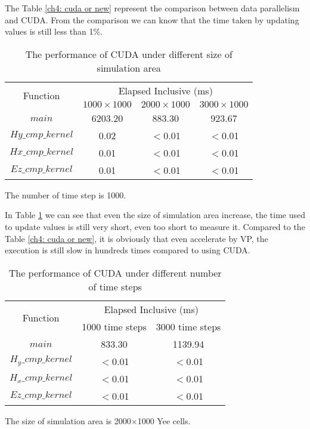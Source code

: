 The Table \ref{ch4: cuda or new} represent the comparison between data parallelism and CUDA. From the comparison we can know that the time taken by updating values is still less than 1\%.

\begin{table}[hp]
	\centering
	\begin{threeparttable}
		\caption{The performance of CUDA under different size of simulation area}\label{ch4: cuda, size}
		\begin{tabular}{cccc}
			\toprule
			\multirow{2}{2em}{Function}&\multicolumn{3}{c}{Elapsed Inclusive (ms)}\\ 
			\cline{2-4}
			& $1000\times1000$ & $2000\times1000$ & $3000\times1000$\\ 
			
			\midrule
			$main$ & 6203.20 & 883.30 & 923.67 \\
			$Hy\_cmp\_kernel$ & 0.02 & $<$0.01 & $<$0.01\\ 
			$Hx\_cmp\_kernel$ & 0.01 & $<$0.01 & $<$0.01\\ 
			$Ez\_cmp\_kernel$ & 0.01 & $<$0.01 & $<$0.01\\
			\bottomrule
		\end{tabular}
		\begin{tablenotes}
			\item[1] The number of time step is 1000.
		\end{tablenotes}
	\end{threeparttable}
\end{table}

In Table \ref{ch4: cuda, size} we can see that even the size of simulation area increase, the time used to update values is still very short, even too short to measure it. Compared to the Table \ref{ch4: cuda or new}, it is obviously that even accelerate by VP, the execution is still slow in hundreds times compared to using CUDA.

\begin{table}[hp]
	\centering
	\begin{threeparttable}
		\caption{The performance of CUDA under different number of time steps}\label{ch4: cuda, time}
		\begin{tabular}{ccc}
			\toprule
			\multirow{2}{2em}{Function}&\multicolumn{2}{c}{Elapsed Inclusive (ms)}\\ 
			\cline{2-3}
			& 1000 time steps & 3000 time steps\\ 
			
			\midrule
			$main$ & 833.30 & 1139.94 \\ 
			$H_y\_cmp\_kernel$ & $<$0.01 & $<$0.01 \\ 
			$H_x\_cmp\_kernel$& $<$0.01 & $<$0.01\\ 
			$Ez\_cmp\_kernel$& $<$0.01 & $<$0.01\\
			\bottomrule
		\end{tabular}
		\begin{tablenotes}
			\item[1] The size of simulation area is 2000$\times$1000 Yee cells.
		\end{tablenotes}
	\end{threeparttable}
\end{table}

